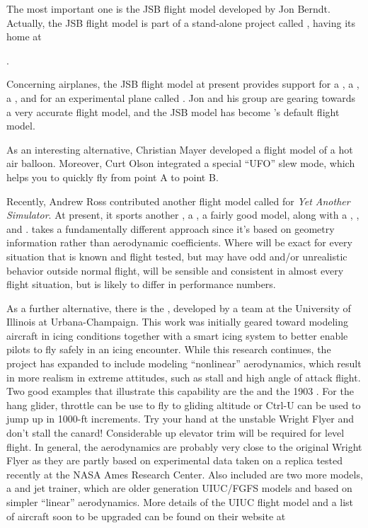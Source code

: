 The most important one is the JSB flight model developed by Jon Berndt. Actually, the JSB
flight model is part of a stand-alone project called \JSBSim, having its home at
 \medskip

.
 \medskip

 \noindent
Concerning airplanes, the JSB flight model at present provides support for a
, a , a , and for an experimental plane
called . Jon and his group are gearing towards a very accurate flight model, and the
JSB model has become \FlightGear{}'s default flight model.

As an interesting alternative, Christian Mayer developed a flight model of a hot air
balloon. Moreover, Curt Olson integrated a special ``UFO'' slew mode, which
helps you to quickly fly from point A to point B.

Recently, Andrew Ross contributed another flight model called \YASim{} for
\textit{Yet Another Simulator}. At present, it sports another , a
, a fairly good  model, along with a ,
, and . \YASim{} takes a fundamentally different approach since it's
based on geometry information rather than aerodynamic coefficients. Where \JSBSim{} will be exact for every situation that is known and flight tested, but may have odd and/or unrealistic behavior outside normal flight, \YASim{} will be sensible and consistent in almost every flight situation, but is likely to differ in performance numbers.

As a further alternative, there is the , developed by a 
team at the University of Illinois at Urbana-Champaign.  This work was 
initially geared toward modeling aircraft in icing conditions together with a smart icing system to better enable pilots to fly safely in an icing 
encounter.  While this research continues, the project has expanded to 
include modeling ``nonlinear'' aerodynamics, which result in more realism 
in extreme attitudes, such as stall and high angle of attack flight.  Two 
good examples that illustrate this capability are the  
 and the 1903 .  For the hang glider, throttle can 
be use to fly to gliding altitude or Ctrl-U can be used to jump up in 
1000-ft increments.  Try your hand at the unstable Wright Flyer and don't 
stall the canard!  Considerable up elevator trim will be required for level 
flight.  In general, the aerodynamics are probably very close to the 
original Wright Flyer as they are partly based on experimental data taken 
on a replica tested recently at the NASA Ames Research Center.  Also 
included are two more models, a  and  jet trainer, 
which are older generation UIUC/FGFS models and based on simpler ``linear'' 
aerodynamics.  More details of the UIUC flight model and a list of aircraft 
soon to be upgraded can be found on their website at
\medskip

